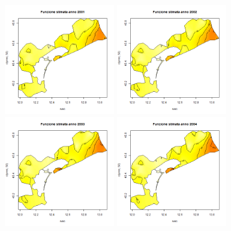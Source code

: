 \documentclass[a4paper,11pt,twoside,openright]{book}							%
\begin{document}
\begin{figure}[H]
	\includegraphics[width=0.43\textwidth ,height=0.235\textheight]{Immagini/venezia_con_covariate/Anno2001.png}
	\includegraphics[width=0.43\textwidth ,height=0.235\textheight]{Immagini/venezia_con_covariate/Anno2002.png}
	\includegraphics[width=0.43\textwidth ,height=0.235\textheight]{Immagini/venezia_con_covariate/Anno2003.png}
	\includegraphics[width=0.43\textwidth ,height=0.235\textheight]{Immagini/venezia_con_covariate/Anno2004.png}
\end{figure}
\end{document}
